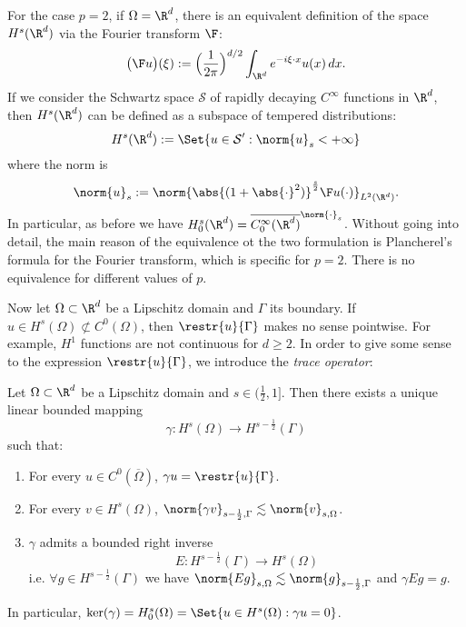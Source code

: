 For the case $p=2$, if $\Omega = \R^d$, there is an equivalent definition of the space $H^s(\R^d)$ via the Fourier transform $\F$:
\[
\bigl(\F u\bigr)(\xi) := \Bigl(\frac{1}{2\pi} \Bigr)^{d/2} \int_{\R^d} e^{-i \xi \cdot x} u(x) \,dx.
\]
If we consider the Schwartz space $\mathcal{S}$ of rapidly decaying $C^\infty$ functions in $\R^d$, then $H^s(\R^d)$ can be defined as a subspace of tempered distributions:
\[
H^s(\R^d) := \Set{u \in \mathcal{S}' : \norm{u}_s < +\infty}
\]
where the norm is
\[
\norm{u}_s := \norm{\abs{(1+\abs{\cdot}^2)}^{\frac{s}{2}} \F u(\cdot)}_{L^2(\R^d)}.
\]
In particular, as before we have $H^s_0(\R^d) = \overline{C^\infty_0(\R^d)}^{\norm{\cdot}_s}$.
Without going into detail, the main reason of the equivalence ot the two formulation is Plancherel's formula for the Fourier transform, which is specific for $p=2$. There is no equivalence for different values of $p$.

Now let $\Omega \subset \R^d$ be a Lipschitz domain and $\Gamma$ its boundary. If $u \in H^s(\Omega) \not\subset C^0(\Omega)$, then $\restr{u}{\Gamma}$ makes no sense pointwise. For example, $H^1$ functions are not continuous for $d \ge 2$. In order to give some sense to the expression $\restr{u}{\Gamma}$, we introduce the \emph{trace operator}:
\begin{theorem}
Let $\Omega \subset \R^d$ be a Lipschitz domain and $s \in (\frac{1}{2}, 1]$. Then there exists a unique linear bounded mapping
\[
\gamma: H^s(\Omega) \to H^{s-\frac{1}{2}}(\Gamma)
\]
such that:
\begin{enumerate}
\item For every $u \in C^0(\overline{\Omega})$, $\gamma u = \restr{u}{\Gamma}$.
\item For every $v \in H^s(\Omega)$, $\norm{\gamma v}_{s-\frac{1}{2},\Gamma} \lesssim \norm{v}_{s,\Omega}$.
\item $\gamma$ admits a bounded right inverse
\[
E: H^{s-\frac{1}{2}}(\Gamma) \to H^s(\Omega)
\]
i.e. $\forall g\in H^{s-\frac{1}{2}}(\Gamma)$ we have $\norm{E g}_{s,\Omega} \lesssim \norm{g}_{s-\frac{1}{2},\Gamma}$ and $\gamma E g = g$.
\end{enumerate}
In particular, $\ker(\gamma) = H^s_0(\Omega) = \Set{u \in H^s(\Omega) : \gamma u = 0}$.
\end{theorem}

